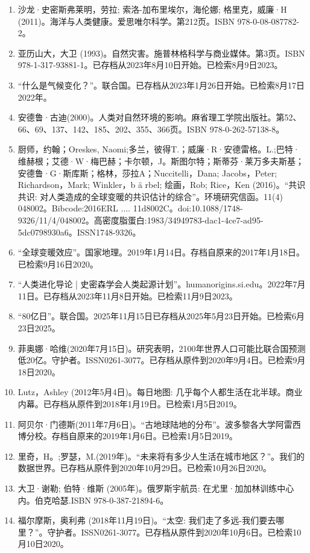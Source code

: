 \begin{enumerate}
\item 沙龙·史密斯弗莱明，劳拉; 索洛-加布里埃尔，海伦娜; 格里克，威廉·H (2011)。海洋与人类健康。爱思唯尔科学。第212页。ISBN 978-0-08-087782-2。
\item 亚历山大，大卫 (1993)。自然灾害。施普林格科学与商业媒体。第3页。ISBN 978-1-317-93881-1。已存档从2023年8月10日开始。已检索8月9日2023。
\item “什么是气候变化？”。联合国。已存档从2023年1月26日开始。已检索8月17日2022年。
\item 安德鲁·古迪(2000)。人类对自然环境的影响。麻省理工学院出版社。第52、66、69、137、142、185、202、355、366页。ISBN 978-0-262-57138-8。
\item 厨师，约翰；Oreskes, Naomi;多兰，彼得T.；威廉·R·安德雷格。L.;巴特·维赫根；艾德·W·梅巴赫；卡尔顿，J。斯图尔特；斯蒂芬·莱万多夫斯基；安德鲁·G·斯库斯；格林，莎拉A；Nuccitelli，Dana; Jacobs，Peter; Richardson，Mark; Winkler，b ä rbel; 绘画，Rob; Rice，Ken (2016)。“共识共识: 对人类造成的全球变暖的共识估计的综合”。环境研究信函。11(4) 048002。Bibcode:2016ERL .... 11d8002C。doi:10.1088/1748-9326/11/4/048002。高密度脂蛋白:1983/34949783-dac1-4ce7-ad95-5dc0798930a6。ISSN1748-9326。 
\item “全球变暖效应”。国家地理。2019年1月14日。存档自原来的2017年1月18日。已检索9月16日2020。
\item “人类进化导论 | 史密森学会人类起源计划”。humanorigins.si.edu。2022年7月11日。已存档从2023年11月8日开始。已检索11月9日2023。
\item “80亿日”。联合国。2025年11月15日已存档从2025年5月23日开始。已检索6月23日2025。
\item 菲奥娜·哈维(2020年7月15日)。研究表明，2100年世界人口可能比联合国预测低20亿。守护者。ISSN0261-3077。已存档从原件到2020年9月4日。已检索9月18日2020。 
\item Lutz，Ashley (2012年5月4日)。每日地图: 几乎每个人都生活在北半球。商业内幕。已存档从原件到2018年1月19日。已检索1月5日2019。
\item 阿贝尔·门德斯(2011年7月6日)。“古地球陆地的分布”。波多黎各大学阿雷西博分校。存档自原来的2019年1月6日。已检索1月5日2019。
\item 里奇，H。;罗瑟，M.(2019年)。“未来将有多少人生活在城市地区？”。我们的数据世界。已存档从原件到2020年10月29日。已检索10月26日2020。
\item 大卫·谢勒; 伯特·维斯 (2005年)。俄罗斯宇航员: 在尤里·加加林训练中心内。伯克哈瑟.ISBN 978-0-387-21894-6。
\item 福尔摩斯，奥利弗 (2018年11月19日)。“太空: 我们走了多远-我们要去哪里？”。守护者。ISSN0261-3077。已存档从原件到2020年10月6日。已检索10月10日2020。 

\end{enumerate}
